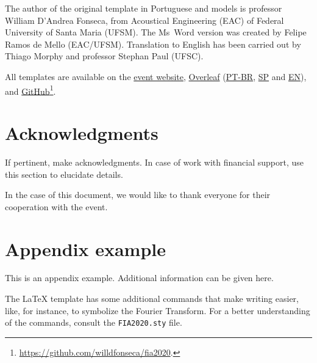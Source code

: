 \documentclass[12pt, a4paper, twoside, twocolumn]{article}
\begin{document}
\clearpage
The author of the original template in Portuguese and models is professor William D'Andrea Fonseca, from Acoustical Engineering (EAC) of Federal University of Santa Maria (UFSM).
The Ms~Word version was created by Felipe Ramos de Mello (EAC/UFSM).
Translation to English has been carried out by Thiago Morphy and professor Stephan Paul (UFSC). 

All templates are available on the \href{http://www.fia2022.com.br}{event website}, \href{https://www.overleaf.com/read/hgryywpgmxdx}{Overleaf} (\href{https://www.overleaf.com/read/rnfjxkknksnd}{PT-BR}, \href{https://www.overleaf.com/read/rszcxtwshzfr}{SP} and \href{https://www.overleaf.com/read/hgryywpgmxdx}{EN}),  and \href{https://github.com/willdfonseca/fia2020}{GitHub}\footnote{\url{https://github.com/willdfonseca/fia2020}.}.

\section{Acknowledgments}

If pertinent, make acknowledgments. In case of work with financial support, use this section to elucidate details.

In the case of this document, we would like to thank everyone for their cooperation with the event.

\renewcommand{\refname}{References} 
 
{\fontrefs }
\appendix
\section{Appendix example}

This is an appendix example. Additional information can be given here.

The \LaTeX\xspace template has some additional commands that make writing easier, like, for instance, \F\xspace to symbolize the Fourier Transform. For a better understanding of the commands, consult the \texttt{FIA2020.sty} file.
\end{document}
